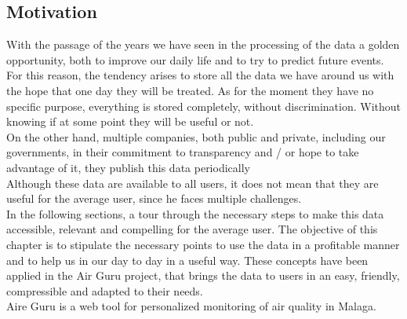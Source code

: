 \subsection*{Motivation}

With the passage of the years we have seen in the processing of the data a golden opportunity, 
both to improve our daily life and to try to predict
future events. For this reason, the tendency arises to store all the data we have
around us with the hope that one day they will be treated.
As for the moment they have no specific purpose, everything is stored completely, without discrimination.
Without knowing if at some point they will be useful or not. \\

On the other hand, multiple companies, both public and private, including our governments, 
in their commitment to transparency and / or hope to take advantage of it, they publish this data 
periodically \\

Although these data are available to all users, it does not mean that they are useful for the 
average user, since he faces multiple challenges. \\

In the following sections, a tour through the necessary steps to make this data
accessible, relevant and compelling for the average user.
The objective of this chapter is to stipulate the necessary points to use the data in a profitable manner and
to help us in our day to day in a useful way. These concepts have been applied in the Air Guru project,
that brings the data to users in an easy, friendly, compressible and adapted to their needs. \\

Aire Guru is a web tool for personalized monitoring of air quality in Malaga.
